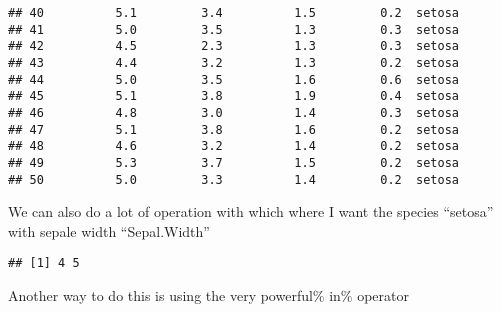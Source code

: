 \documentclass[
]{article}
\newenvironment{Shaded}{\begin{snugshade}}{\end{snugshade}}
\newcommand{\FloatTok}[1]{\textcolor[rgb]{0.00,0.00,0.81}{#1}}
\newcommand{\FunctionTok}[1]{\textcolor[rgb]{0.13,0.29,0.53}{\textbf{#1}}}
\newcommand{\NormalTok}[1]{#1}
\newcommand{\SpecialCharTok}[1]{\textcolor[rgb]{0.81,0.36,0.00}{\textbf{#1}}}
\newcommand{\StringTok}[1]{\textcolor[rgb]{0.31,0.60,0.02}{#1}}
\begin{document}
\begin{verbatim}
## 40          5.1         3.4          1.5         0.2  setosa
## 41          5.0         3.5          1.3         0.3  setosa
## 42          4.5         2.3          1.3         0.3  setosa
## 43          4.4         3.2          1.3         0.2  setosa
## 44          5.0         3.5          1.6         0.6  setosa
## 45          5.1         3.8          1.9         0.4  setosa
## 46          4.8         3.0          1.4         0.3  setosa
## 47          5.1         3.8          1.6         0.2  setosa
## 48          4.6         3.2          1.4         0.2  setosa
## 49          5.3         3.7          1.5         0.2  setosa
## 50          5.0         3.3          1.4         0.2  setosa
\end{verbatim}

We can also do a lot of operation with which where I want the species
``setosa'' with sepale width ``Sepal.Width''

\begin{Shaded}
\end{Shaded}

\begin{verbatim}
## [1] 4 5
\end{verbatim}

Another way to do this is using the very powerful\% in\% operator

\begin{Shaded}
\end{Shaded}
\end{document}

